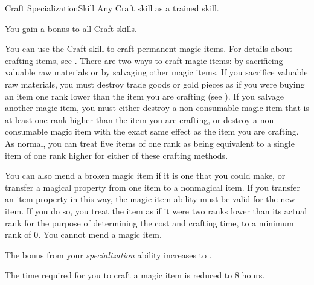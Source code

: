   \begin{feat}{Craft Specialization}{Skill}
    \featpre Any Craft skill as a trained skill.

     You gain a  bonus to all Craft skills.

     You can use the Craft skill to craft permanent magic items.
    For details about crafting items, see .
    There are two ways to craft magic items: by sacrificing valuable raw materials or by salvaging other magic items.
    If you sacrifice valuable raw materials, you must destroy trade goods or gold pieces as if you were buying an item one rank lower than the item you are crafting  (see ).
    If you salvage another magic item, you must either destroy a non-consumable magic item that is at least one rank higher than the item you are crafting, or destroy a non-consumable magic item with the exact same effect as the item you are crafting.
    As normal, you can treat five items of one rank as being equivalent to a single item of one rank higher for either of these crafting methods.

    You can also mend a broken magic item if it is one that you could make, or transfer a magical property from one item to a nonmagical item.
    If you transfer an item property in this way, the magic item ability must be valid for the new item.
    If you do so, you treat the item as if it were two ranks lower than its actual rank for the purpose of determining the cost and crafting time, to a minimum rank of 0.
    You cannot mend a  magic item.

     The bonus from your \textit{specialization} ability increases to .

     The time required for you to craft a magic item is reduced to 8 hours.
  \end{feat}

